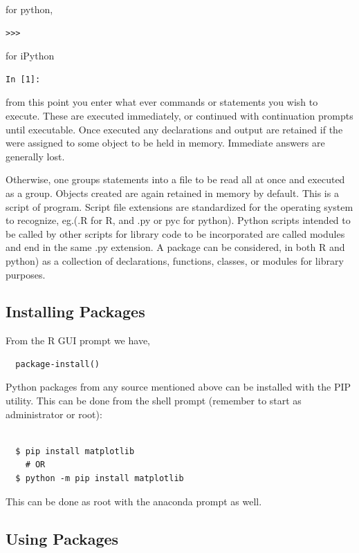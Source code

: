 \documentclass[]{book}
\theoremstyle{definition}
\theoremstyle{definition}
\theoremstyle{definition}
\theoremstyle{remark}
\begin{document}
for python,

\begin{verbatim}
>>>
\end{verbatim}

for iPython

\begin{verbatim}
In [1]:
\end{verbatim}

from this point you enter what ever commands or statements you wish to
execute. These are executed immediately, or continued with continuation
prompts until executable. Once executed any declarations and output are
retained if the were assigned to some object to be held in memory.
Immediate answers are generally lost.

Otherwise, one groups statements into a file to be read all at once and
executed as a group. Objects created are again retained in memory by
default. This is a script of program. Script file extensions are
standardized for the operating system to recognize, eg.(.R for R, and
.py or pyc for python). Python scripts intended to be called by other
scripts for library code to be incorporated are called modules and end
in the same .py extension. A package can be considered, in both R and
python) as a collection of declarations, functions, classes, or modules
for library purposes.

\subsection{Installing Packages}\label{installing-packages}

From the R GUI prompt we have,

\begin{verbatim}
  package-install()
\end{verbatim}

Python packages from any source mentioned above can be installed with
the PIP utility. This can be done from the shell prompt (remember to
start as administrator or root):

\begin{verbatim}

  $ pip install matplotlib  
    # OR
  $ python -m pip install matplotlib
\end{verbatim}

This can be done as root with the anaconda prompt as well.

\subsection{Using Packages}\label{using-packages}
\end{document}
